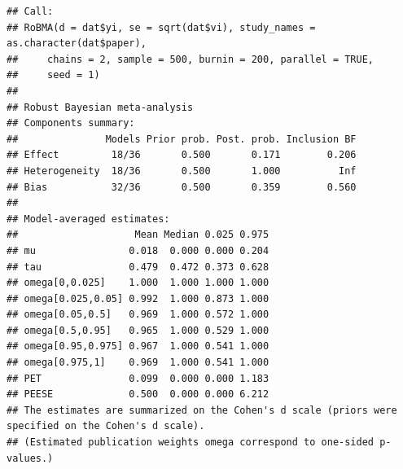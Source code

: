 \documentclass[
]{book}
\newenvironment{Shaded}{\begin{snugshade}}{\end{snugshade}}
\newcommand{\AttributeTok}[1]{\textcolor[rgb]{0.13,0.29,0.53}{#1}}
\newcommand{\CommentTok}[1]{\textcolor[rgb]{0.56,0.35,0.01}{\textit{#1}}}
\newcommand{\ConstantTok}[1]{\textcolor[rgb]{0.56,0.35,0.01}{#1}}
\newcommand{\DecValTok}[1]{\textcolor[rgb]{0.00,0.00,0.81}{#1}}
\newcommand{\FunctionTok}[1]{\textcolor[rgb]{0.13,0.29,0.53}{\textbf{#1}}}
\newcommand{\NormalTok}[1]{#1}
\newcommand{\OtherTok}[1]{\textcolor[rgb]{0.56,0.35,0.01}{#1}}
\newcommand{\SpecialCharTok}[1]{\textcolor[rgb]{0.81,0.36,0.00}{\textbf{#1}}}
\begin{document}
\begin{Shaded}
\end{Shaded}

\begin{verbatim}
## Call:
## RoBMA(d = dat$yi, se = sqrt(dat$vi), study_names = as.character(dat$paper), 
##     chains = 2, sample = 500, burnin = 200, parallel = TRUE, 
##     seed = 1)
## 
## Robust Bayesian meta-analysis
## Components summary:
##               Models Prior prob. Post. prob. Inclusion BF
## Effect         18/36       0.500       0.171        0.206
## Heterogeneity  18/36       0.500       1.000          Inf
## Bias           32/36       0.500       0.359        0.560
## 
## Model-averaged estimates:
##                    Mean Median 0.025 0.975
## mu                0.018  0.000 0.000 0.204
## tau               0.479  0.472 0.373 0.628
## omega[0,0.025]    1.000  1.000 1.000 1.000
## omega[0.025,0.05] 0.992  1.000 0.873 1.000
## omega[0.05,0.5]   0.969  1.000 0.572 1.000
## omega[0.5,0.95]   0.965  1.000 0.529 1.000
## omega[0.95,0.975] 0.967  1.000 0.541 1.000
## omega[0.975,1]    0.969  1.000 0.541 1.000
## PET               0.099  0.000 0.000 1.183
## PEESE             0.500  0.000 0.000 6.212
## The estimates are summarized on the Cohen's d scale (priors were specified on the Cohen's d scale).
## (Estimated publication weights omega correspond to one-sided p-values.)
\end{verbatim}
\end{document}
